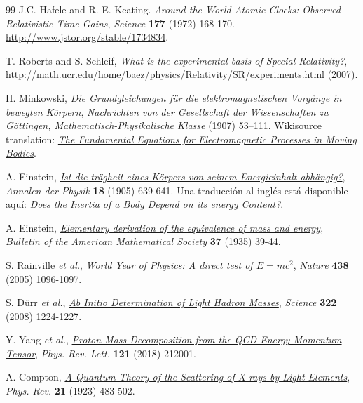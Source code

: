 \begin{thebibliography}{99}
 J.C. Hafele and R. E. Keating. {\it Around-the-World Atomic Clocks: Observed Relativistic Time Gains}, {\sl Science} {\bf 177} (1972) 168-170. \url{http://www.jstor.org/stable/1734834}.

 T. Roberts and S. Schleif, {\it What is the experimental basis of Special Relativity?},  \url{http://math.ucr.edu/home/baez/physics/Relativity/SR/experiments.html} (2007).

 H. Minkowski, \href{http://de.wikisource.org/wiki/Die_Grundgleichungen_f\%C3\%BCr_die_elektromagnetischen_Vorg\%C3\%A4nge_in_bewegten_K\%C3\%B6rpern}{\it Die Grundgleichungen f\"ur die elektromagnetischen Vorgänge in bewegten Körpern}, {\sl Nachrichten von der Gesellschaft der Wissenschaften zu Göttingen, Mathematisch-Physikalische Klasse} (1907) 53–111. Wikisource translation: \href{http://en.wikisource.org/wiki/The_Fundamental_Equations_for_Electromagnetic_Processes_in_Moving_Bodies}{\it The Fundamental Equations for Electromagnetic Processes in Moving Bodies}.

 A. Einstein, \href{https://doi.org/10.1002\%2Fandp.19053231314}{\textit{Ist die trägheit eines Körpers von seinem Energieinhalt abhängig?}}, {\sl Annalen der Physik} {\bf 18} (1905) 639-641. Una traducción al inglés está disponible aquí: \href{{https://www.fourmilab.ch/etexts/einstein/E_mc2/e_mc2.pdf}}{\textit{Does the Inertia of a Body Depend on its energy Content?}}.

 A. Einstein, \href{http://www.ams.org/journals/bull/2000-37-01/S0273-0979-99-00805-8/S0273-0979-99-00805-8.pdf}
{\textit{Elementary derivation of the equivalence of mass and energy}}, {\sl Bulletin of the American Mathematical Society} {\bf 37} (1935) 39-44.

 S. Rainville \textit{et al.}, \href{https://doi.org/10.1038/4381096a}{\it World Year of Physics: A direct test of $E=mc^2$}, {\sl Nature} {\bf 438} (2005) 1096-1097.

 S. Dürr \textit{et al.}, \href{https://doi.org/10.1126/science.1163233}{\it Ab Initio Determination of Light Hadron Masses}, {\sl Science} {\bf 322} (2008) 1224-1227.

 Y. Yang \textit{et al.}, \href{https://doi.org/10.1103/PhysRevLett.121.212001}{\it Proton Mass Decomposition from the QCD Energy Momentum Tensor}, {\sl Phys. Rev. Lett.} {\bf 121} (2018) 212001.

 A. Compton, \href{http://prola.aps.org/abstract/PR/v21/i5/p483_1}{\it A Quantum Theory of the Scattering of X-rays by Light Elements}, {\sl Phys. Rev.} {\bf 21} (1923) 483-502.


\end{thebibliography}
